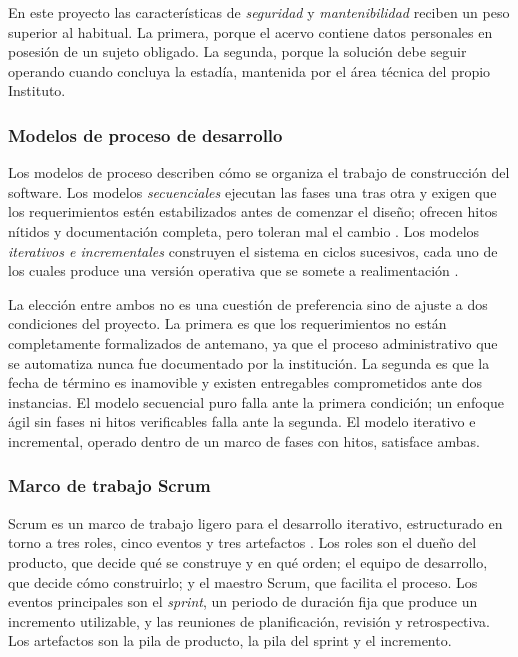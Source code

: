 En este proyecto las características de \emph{seguridad} y \emph{mantenibilidad} reciben un peso superior al habitual. La primera, porque el acervo contiene datos personales en posesión de un sujeto obligado. La segunda, porque la solución debe seguir operando cuando concluya la estadía, mantenida por el área técnica del propio Instituto.

\subsubsection{Modelos de proceso de desarrollo}

Los modelos de proceso describen cómo se organiza el trabajo de construcción del software. Los modelos \emph{secuenciales} ejecutan las fases una tras otra y exigen que los requerimientos estén estabilizados antes de comenzar el diseño; ofrecen hitos nítidos y documentación completa, pero toleran mal el cambio \cite{sommerville2011}. Los modelos \emph{iterativos e incrementales} construyen el sistema en ciclos sucesivos, cada uno de los cuales produce una versión operativa que se somete a realimentación \cite{pressman2010}.

La elección entre ambos no es una cuestión de preferencia sino de ajuste a dos condiciones del proyecto. La primera es que los requerimientos no están completamente formalizados de antemano, ya que el proceso administrativo que se automatiza nunca fue documentado por la institución. La segunda es que la fecha de término es inamovible y existen entregables comprometidos ante dos instancias. El modelo secuencial puro falla ante la primera condición; un enfoque ágil sin fases ni hitos verificables falla ante la segunda. El modelo iterativo e incremental, operado dentro de un marco de fases con hitos, satisface ambas.

\subsubsection{Marco de trabajo Scrum}

Scrum es un marco de trabajo ligero para el desarrollo iterativo, estructurado en torno a tres roles, cinco eventos y tres artefactos \cite{scrumguide2020}. Los roles son el dueño del producto, que decide qué se construye y en qué orden; el equipo de desarrollo, que decide cómo construirlo; y el maestro Scrum, que facilita el proceso. Los eventos principales son el \emph{sprint}, un periodo de duración fija que produce un incremento utilizable, y las reuniones de planificación, revisión y retrospectiva. Los artefactos son la pila de producto, la pila del sprint y el incremento.

